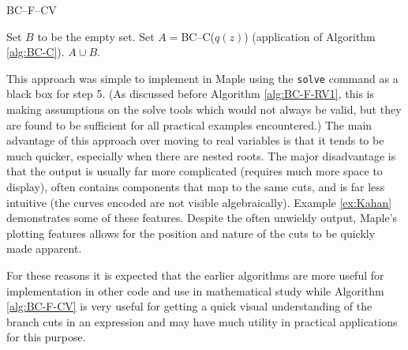 \documentclass{llncs}
\begin{document}
\begin{algorithm}[ht] \caption{BC--F--CV} \label{alg:BC-F-CV}
\DontPrintSemicolon
{}
\BlankLine
{}
{Set $B$ to be the empty set. \;}
Set $A = $BC--C($q(z)$) (application of Algorithm \ref{alg:BC-C}).\;
\Return $A \cup B$.
\end{algorithm}

This approach was simple to implement in {\sc Maple} using the \texttt{solve} command as a black box for step 5.  (As discussed before Algorithm \ref{alg:BC-F-RV1}, this is making assumptions on the solve tools which would not always be valid, but they are found to be sufficient for all practical examples encountered.)   
The main advantage of this approach over moving to real variables is that it tends to be much quicker, especially when there are nested roots.  The major disadvantage is that the output is usually far more complicated (requires much more space to display), often contains components that map to the same cuts, and is far less intuitive (the curves encoded are not visible algebraically).  Example \ref{ex:Kahan} demonstrates some of these features.  Despite the often unwieldy output, {\sc Maple}'s plotting features allows for the position and nature of the cuts to be quickly made apparent.

For these reasons it is expected that the earlier algorithms are more useful for implementation in other code and use in mathematical study while Algorithm \ref{alg:BC-F-CV} is very useful for getting a quick visual understanding of the branch cuts in an expression and may have much utility in practical applications for this purpose. 
\end{document}

